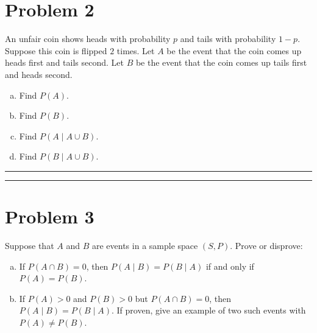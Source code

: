\documentclass{article}
\theoremstyle{definition}
\newenvironment{solution}{\bigskip\hrule{\hfill}}{\bigskip\hrule{\hfill}} %
\begin{document}
\section*{Problem 2}

An unfair coin shows heads with probability $p$ and tails with probability $1-p$. Suppose this coin is flipped $2$ times. Let $A$ be the event that the coin comes up heads first and tails second. Let $B$ be the event that the coin comes up tails first and heads second.
\begin{enumerate}[a)] %
    \item Find $P\left(A\right)$.
    \item Find $P\left(B\right)$.
    \item Find $P\left(A\mid A\cup B\right)$.
    \item Find $P\left(B\mid A\cup B\right)$.
\end{enumerate}

\begin{solution}


\end{solution}


\newpage


\section*{Problem 3}

Suppose that $A$ and $B$ are events in a sample space $\left(S,P\right)$. Prove or disprove:
\begin{enumerate}[a)] %
    \item If $P\left(A\cap B\right)=0$, then $P\left(A\mid B\right)=P\left(B\mid A\right)$ if and only if $P\left(A\right)=P\left(B\right)$.
    \item If $P\left(A\right)>0$ and $P\left(B\right)>0$ but $P\left(A\cap B\right)=0$, then $P\left(A\mid B\right)=P\left(B\mid A\right)$. If proven, give an example of two such events with $P\left(A\right)\neq P\left(B\right)$.
\end{enumerate}
\end{document}
